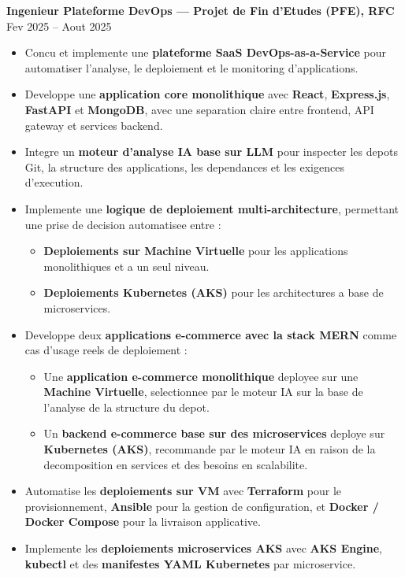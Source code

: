 \documentclass[10pt, letterpaper]{article}
\newenvironment{highlights}{
\begin{itemize}[leftmargin=12pt, itemsep=2pt]
}{
\end{itemize}
}
\begin{document}
\textbf{Ingenieur Plateforme DevOps --- Projet de Fin d'Etudes (PFE), RFC} \hfill Fev 2025 -- Aout 2025
\begin{highlights}
\item Concu et implemente une \textbf{plateforme SaaS DevOps-as-a-Service} pour automatiser l'analyse, le deploiement et le monitoring d'applications.
\item Developpe une \textbf{application core monolithique} avec \textbf{React}, \textbf{Express.js}, \textbf{FastAPI} et \textbf{MongoDB}, avec une separation claire entre frontend, API gateway et services backend.
\item Integre un \textbf{moteur d'analyse IA base sur LLM} pour inspecter les depots Git, la structure des applications, les dependances et les exigences d'execution.
\item Implemente une \textbf{logique de deploiement multi-architecture}, permettant une prise de decision automatisee entre :
\begin{itemize}[leftmargin=16pt, itemsep=2pt]
  \item \textbf{Deploiements sur Machine Virtuelle} pour les applications monolithiques et a un seul niveau.
  \item \textbf{Deploiements Kubernetes (AKS)} pour les architectures a base de microservices.
\end{itemize}
\item Developpe deux \textbf{applications e-commerce avec la stack MERN} comme cas d'usage reels de deploiement :
\begin{itemize}[leftmargin=16pt, itemsep=2pt]
  \item Une \textbf{application e-commerce monolithique} deployee sur une \textbf{Machine Virtuelle}, selectionnee par le moteur IA sur la base de l'analyse de la structure du depot.
  \item Un \textbf{backend e-commerce base sur des microservices} deploye sur \textbf{Kubernetes (AKS)}, recommande par le moteur IA en raison de la decomposition en services et des besoins en scalabilite.
\end{itemize}
\item Automatise les \textbf{deploiements sur VM} avec \textbf{Terraform} pour le provisionnement, \textbf{Ansible} pour la gestion de configuration, et \textbf{Docker / Docker Compose} pour la livraison applicative.
\item Implemente les \textbf{deploiements microservices AKS} avec \textbf{AKS Engine}, \textbf{kubectl} et des \textbf{manifestes YAML Kubernetes} par microservice.

\end{highlights}
\end{document}
